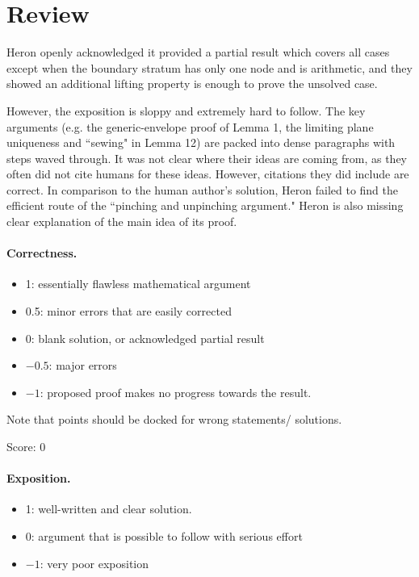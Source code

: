 \documentclass[11pt]{article}
\theoremstyle{remark}
\begin{document}
\maketitle

\section{Review}

Heron openly acknowledged it provided a partial result which covers all cases except when the boundary stratum has only one node and is arithmetic, and they showed an additional lifting property is enough to prove the unsolved case. 

However, the exposition is sloppy and extremely hard to follow. The key arguments (e.g. the generic-envelope proof of Lemma 1, the limiting plane uniqueness and ``sewing" in Lemma 12) are packed into dense paragraphs with steps waved through. It was not clear where their ideas are coming from, as they often did not cite humans for these ideas. However, citations they did include are correct. In comparison to the human author's solution, Heron failed to find the efficient route of the ``pinching and unpinching argument." Heron is also missing clear explanation of the main idea of its proof. 
\paragraph{Correctness.}
\begin{itemize}
	\item  1: essentially flawless mathematical argument
	\item  0.5: minor errors that are easily corrected
	\item  0: blank solution, or acknowledged partial result
	\item  $-0.5$: major errors
	\item  $-1$: proposed proof makes no progress towards the result.
\end{itemize}
Note that points should be docked for wrong statements/ solutions.

\noindent Score: 0

\paragraph{Exposition.}
\begin{itemize}
	\item  1: well-written and clear solution.
	\item  0: argument that is possible to follow with serious effort
	\item  $-1$: very poor exposition
\end{itemize}
\end{document}
